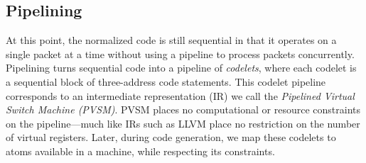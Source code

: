 
\subsection{Pipelining}
\label{ss:partitioning}
At this point, the normalized code is still sequential in that it operates on a
single packet at a time without using a pipeline to process packets
concurrently.  Pipelining turns sequential code into a pipeline of
\textit{codelets}, where each codelet is a sequential block of three-address
code statements. This codelet pipeline corresponds to an intermediate
representation (IR) we call the \textit{Pipelined Virtual Switch Machine
(PVSM)}. PVSM places no computational or resource constraints on the
pipeline---much like IRs such as LLVM place no restriction on the number of
virtual registers. Later, during code generation, we map these codelets to
atoms available in a \absmachine machine, while respecting its constraints.


